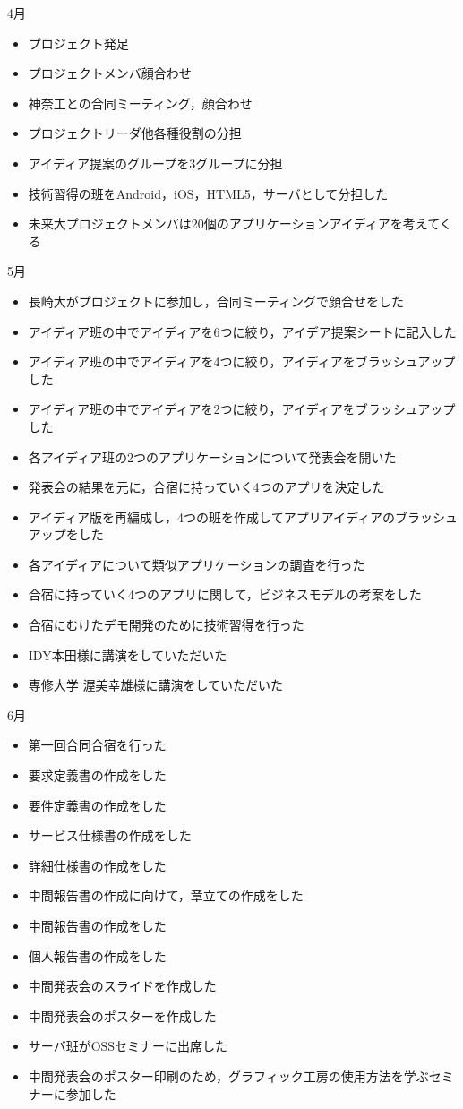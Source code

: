 4月
\begin{itemize}
\item プロジェクト発足
\item プロジェクトメンバ顔合わせ
\item 神奈工との合同ミーティング，顔合わせ
\item プロジェクトリーダ他各種役割の分担
\item アイディア提案のグループを3グループに分担
\item 技術習得の班をAndroid，iOS，HTML5，サーバとして分担した
\item 未来大プロジェクトメンバは20個のアプリケーションアイディアを考えてくる
\end{itemize}
5月
\begin{itemize}
\item 長崎大がプロジェクトに参加し，合同ミーティングで顔合せをした
\item アイディア班の中でアイディアを6つに絞り，アイデア提案シートに記入した
\item アイディア班の中でアイディアを4つに絞り，アイディアをブラッシュアップした
\item アイディア班の中でアイディアを2つに絞り，アイディアをブラッシュアップした
\item 各アイディア班の2つのアプリケーションについて発表会を開いた
\item 発表会の結果を元に，合宿に持っていく4つのアプリを決定した
\item アイディア版を再編成し，4つの班を作成してアプリアイディアのブラッシュアップをした
\item 各アイディアについて類似アプリケーションの調査を行った
\item 合宿に持っていく4つのアプリに関して，ビジネスモデルの考案をした
\item 合宿にむけたデモ開発のために技術習得を行った
\item IDY本田様に講演をしていただいた
\item 専修大学 渥美幸雄様に講演をしていただいた
\end{itemize}
6月
\begin{itemize}
\item 第一回合同合宿を行った
\item 要求定義書の作成をした
\item 要件定義書の作成をした
\item サービス仕様書の作成をした
\item 詳細仕様書の作成をした
\item 中間報告書の作成に向けて，章立ての作成をした
\item 中間報告書の作成をした
\item 個人報告書の作成をした
\item 中間発表会のスライドを作成した
\item 中間発表会のポスターを作成した
\item サーバ班がOSSセミナーに出席した
\item 中間発表会のポスター印刷のため，グラフィック工房の使用方法を学ぶセミナーに参加した
\end{itemize}
